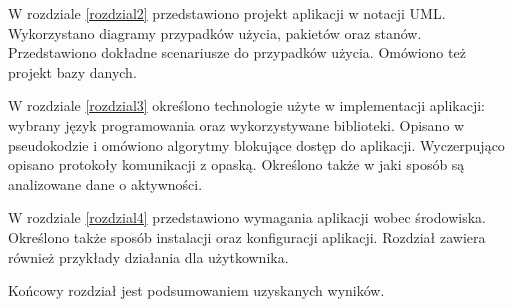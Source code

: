 W rozdziale \ref{rozdzial2} przedstawiono projekt aplikacji w notacji UML. Wykorzystano diagramy przypadków użycia, pakietów oraz stanów. Przedstawiono dokładne scenariusze do przypadków użycia. Omówiono też projekt bazy danych.

W rozdziale \ref{rozdzial3} określono technologie użyte w implementacji aplikacji: wybrany język programowania oraz wykorzystywane biblioteki. Opisano w pseudokodzie i omówiono algorytmy blokujące dostęp do aplikacji. Wyczerpująco opisano protokoły komunikacji z opaską. Określono także w jaki sposób są analizowane dane o aktywności.

W rozdziale \ref{rozdzial4} przedstawiono wymagania aplikacji wobec środowiska. Określono także sposób instalacji oraz konfiguracji aplikacji. Rozdział zawiera również przykłady działania dla użytkownika.

Końcowy rozdział jest podsumowaniem uzyskanych wyników.



